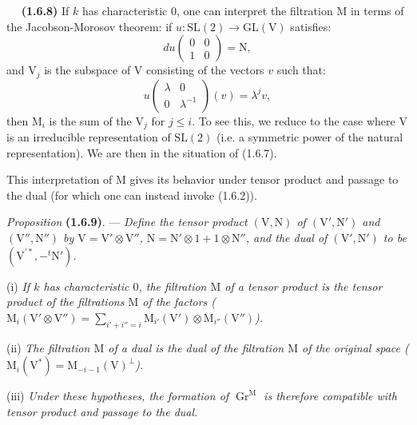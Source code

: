 \documentclass[11pt,leqno]{article}
\newcommand{\Page}[1]{\ifvmode\noindent\else\unskip\ \fi{\footnotesize\textcolor{gray}{[p.\,#1]}}\ \ignorespaces}
\begin{document}
\Page{167}
\textbf{(1.6.8)} If \(k\) has characteristic \(0\), one can interpret the filtration \(\mathrm{M}\) in terms of the Jacobson-Morosov theorem: if \(u:\mathrm{SL}(2)\to\mathrm{GL}(\mathrm{V})\) satisfies:
\[
du\begin{pmatrix}0&0\\1&0\end{pmatrix}=\mathrm{N},
\]
and \(\mathrm{V}_j\) is the subspace of \(\mathrm{V}\) consisting of the vectors \(v\) such that:
\[
u\begin{pmatrix}\lambda&0\\0&\lambda^{-1}\end{pmatrix}(v)=\lambda^jv,
\]
then \(\mathrm{M}_i\) is the sum of the \(\mathrm{V}_j\) for \(j\le i\). To see this, we reduce to the case where \(\mathrm{V}\) is an irreducible representation of \(\mathrm{SL}(2)\) (i.e. a symmetric power of the natural representation). We are then in the situation of (1.6.7).

This interpretation of \(\mathrm{M}\) gives its behavior under tensor product and passage to the dual (for which one can instead invoke (1.6.2)).

\textit{Proposition} \textbf{(1.6.9)}. — \textit{Define the tensor product \((\mathrm{V},\mathrm{N})\) of \((\mathrm{V}',\mathrm{N}')\) and \((\mathrm{V}'',\mathrm{N}'')\) by \(\mathrm{V}=\mathrm{V}'\otimes\mathrm{V}''\), \(\mathrm{N}=\mathrm{N}'\otimes1+1\otimes\mathrm{N}''\), and the dual of \((\mathrm{V}',\mathrm{N}')\) to be \((\mathrm{V}^{\prime *},-{}^t\mathrm{N}')\).}

(i) \textit{If \(k\) has characteristic \(0\), the filtration \(\mathrm{M}\) of a tensor product is the tensor product of the filtrations \(\mathrm{M}\) of the factors (\(\mathrm{M}_i(\mathrm{V}'\otimes\mathrm{V}'')=\sum\limits_{i'+i''=i}\mathrm{M}_{i'}(\mathrm{V}')\otimes\mathrm{M}_{i''}(\mathrm{V}'')\)).}

(ii) \textit{The filtration \(\mathrm{M}\) of a dual is the dual of the filtration \(\mathrm{M}\) of the original space (\(\mathrm{M}_i(\mathrm{V}^*)=\mathrm{M}_{-i-1}(\mathrm{V})^\perp\)).}

(iii) \textit{Under these hypotheses, the formation of \(\operatorname{Gr}^{\mathrm{M}}\) is therefore compatible with tensor product and passage to the dual.}
\end{document}
